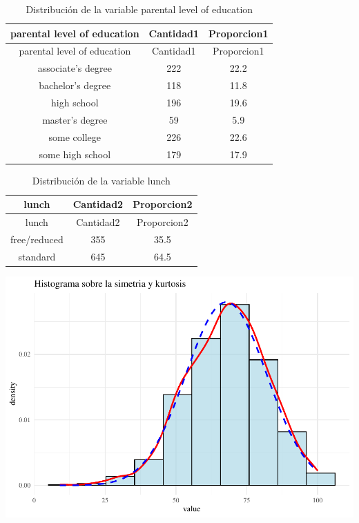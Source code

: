 \documentclass[
]{article}
\begin{document}
\begin{longtable}[]{@{}ccc@{}}
\caption{Distribución de la variable parental level of
education}\tabularnewline
\toprule\noalign{}
parental level of education & Cantidad1 & Proporcion1 \\
\midrule\noalign{}
\endfirsthead
\toprule\noalign{}
parental level of education & Cantidad1 & Proporcion1 \\
\midrule\noalign{}
\endhead
\bottomrule\noalign{}
\endlastfoot
associate's degree & 222 & 22.2 \\
bachelor's degree & 118 & 11.8 \\
high school & 196 & 19.6 \\
master's degree & 59 & 5.9 \\
some college & 226 & 22.6 \\
some high school & 179 & 17.9 \\
\end{longtable}

\begin{longtable}[]{@{}ccc@{}}
\caption{Distribución de la variable lunch}\tabularnewline
\toprule\noalign{}
lunch & Cantidad2 & Proporcion2 \\
\midrule\noalign{}
\endfirsthead
\toprule\noalign{}
lunch & Cantidad2 & Proporcion2 \\
\midrule\noalign{}
\endhead
\bottomrule\noalign{}
\endlastfoot
free/reduced & 355 & 35.5 \\
standard & 645 & 64.5 \\
\end{longtable}

\begin{center}\includegraphics{Trabajo-Grupo-6.-Students-performance_files/figure-latex/unnamed-chunk-2-1} \end{center}
\end{document}
